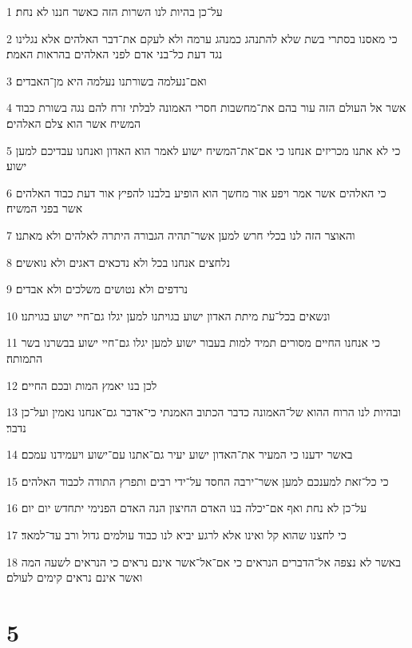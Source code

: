 \par 1 על־כן בהיות לנו השרות הזה כאשר חננו לא נחת׃
\par 2 כי מאסנו בסתרי בשת שלא להתנהג כמנהג ערמה ולא לעקם את־דבר האלהים אלא נגלינו נגד דעת כל־בני אדם לפני האלהים בהראות האמת׃
\par 3 ואם־נעלמה בשורתנו נעלמה היא מן־האבדים׃
\par 4 אשר אל העולם הזה עור בהם את־מחשבות חסרי האמונה לבלתי זרח להם נגה בשורת כבוד המשיח אשר הוא צלם האלהים׃
\par 5 כי לא אתנו מכריזים אנחנו כי אם־את־המשיח ישוע לאמר הוא האדון ואנחנו עבדיכם למען ישוע׃
\par 6 כי האלהים אשר אמר ויפע אור מחשך הוא הופיע בלבנו להפיץ אור דעת כבוד האלהים אשר בפני המשיח׃
\par 7 והאוצר הזה לנו בכלי חרש למען אשר־תהיה הגבורה היתרה לאלהים ולא מאתנו׃
\par 8 נלחצים אנחנו בכל ולא נדכאים דאגים ולא נואשים׃
\par 9 נרדפים ולא נטושים משלכים ולא אבדים׃
\par 10 ונשאים בכל־עת מיתת האדון ישוע בגויתנו למען יגלו גם־חיי ישוע בגויתנו׃
\par 11 כי אנחנו החיים מסורים תמיד למות בעבור ישוע למען יגלו גם־חיי ישוע בבשרנו בשר התמותה׃
\par 12 לכן בנו יאמץ המות ובכם החיים׃
\par 13 ובהיות לנו הרוח ההוא של־האמונה כדבר הכתוב האמנתי כי־אדבר גם־אנחנו נאמין ועל־כן נדבר׃
\par 14 באשר ידענו כי המעיר את־האדון ישוע יעיר גם־אתנו עם־ישוע ויעמידנו עמכם׃
\par 15 כי כל־זאת למענכם למען אשר־ירבה החסד על־ידי רבים ותפרץ התודה לכבוד האלהים׃
\par 16 על־כן לא נחת ואף אם־יכלה בנו האדם החיצון הנה האדם הפנימי יתחדש יום יום׃
\par 17 כי לחצנו שהוא קל ואינו אלא לרגע יביא לנו כבוד עולמים גדול ורב עד־למאד׃
\par 18 באשר לא נצפה אל־הדברים הנראים כי אם־אל־אשר אינם נראים כי הנראים לשעה המה ואשר אינם נראים קימים לעולם׃

\chapter{5}

